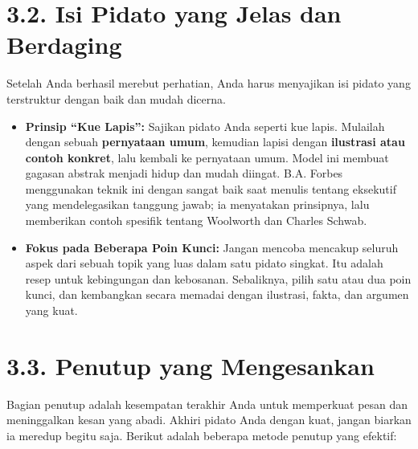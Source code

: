\documentclass[
  letterpaper,
  DIV=11,
  numbers=noendperiod]{scrreprt}
\begin{document}
\section{\texorpdfstring{\textbf{3.2. Isi Pidato yang Jelas dan
Berdaging}}{3.2. Isi Pidato yang Jelas dan Berdaging}}\label{isi-pidato-yang-jelas-dan-berdaging}

Setelah Anda berhasil merebut perhatian, Anda harus menyajikan isi
pidato yang terstruktur dengan baik dan mudah dicerna.

\begin{itemize}
\item
  \textbf{Prinsip ``Kue Lapis'':} Sajikan pidato Anda seperti kue lapis.
  Mulailah dengan sebuah \textbf{pernyataan umum}, kemudian lapisi
  dengan \textbf{ilustrasi atau contoh konkret}, lalu kembali ke
  pernyataan umum. Model ini membuat gagasan abstrak menjadi hidup dan
  mudah diingat. B.A. Forbes menggunakan teknik ini dengan sangat baik
  saat menulis tentang eksekutif yang mendelegasikan tanggung jawab; ia
  menyatakan prinsipnya, lalu memberikan contoh spesifik tentang
  Woolworth dan Charles Schwab.
\item
  \textbf{Fokus pada Beberapa Poin Kunci:} Jangan mencoba mencakup
  seluruh aspek dari sebuah topik yang luas dalam satu pidato singkat.
  Itu adalah resep untuk kebingungan dan kebosanan. Sebaliknya, pilih
  satu atau dua poin kunci, dan kembangkan secara memadai dengan
  ilustrasi, fakta, dan argumen yang kuat.
\end{itemize}

\section{\texorpdfstring{\textbf{3.3. Penutup yang
Mengesankan}}{3.3. Penutup yang Mengesankan}}\label{penutup-yang-mengesankan}

Bagian penutup adalah kesempatan terakhir Anda untuk memperkuat pesan
dan meninggalkan kesan yang abadi. Akhiri pidato Anda dengan kuat,
jangan biarkan ia meredup begitu saja. Berikut adalah beberapa metode
penutup yang efektif:
\end{document}
